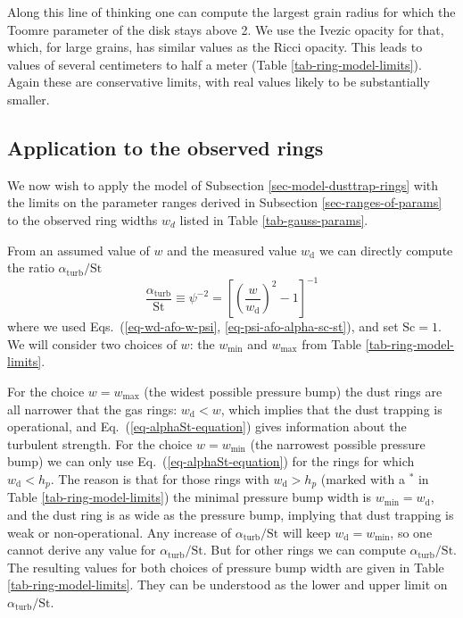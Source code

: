 \documentclass{aa}
\begin{document}
Along this line of thinking one can compute the largest grain radius for which
the Toomre parameter of the disk stays above 2. We use the Ivezic
opacity for that, which, for large grains, has similar values as the Ricci
opacity. This leads to values of several centimeters to half a meter (Table
\ref{tab-ring-model-limits}). Again these are conservative limits, with real
values likely to be substantially smaller. 


\subsection{Application to the observed rings}
\label{sec-application-to-rings}
%
We now wish to apply the model of Subsection \ref{sec-model-dusttrap-rings}
with the limits on the parameter ranges derived in Subsection
\ref{sec-ranges-of-params} to the observed ring widths $w_d$ listed in
Table \ref{tab-gauss-params}. 

From an assumed value of $w$ and the measured value $w_{\mathrm{d}}$ we can
directly compute the ratio $\alpha_{\mathrm{turb}}/\mathrm{St}$
\begin{equation}\label{eq-alphaSt-equation}
\frac{\alpha_{\mathrm{turb}}}{\mathrm{St}} \equiv \psi^{-2} = \left[\left(\frac{w}{w_{\mathrm{d}}}\right)^2-1\right]^{-1}
\end{equation}
where we used Eqs.~(\ref{eq-wd-afo-w-psi}, \ref{eq-psi-afo-alpha-sc-st}), and
set $\mathrm{Sc}=1$. We will consider two choices of $w$: the $w_{\mathrm{min}}$ and
$w_{\mathrm{max}}$ from Table \ref{tab-ring-model-limits}. 

For the choice $w=w_{\mathrm{max}}$ (the widest possible pressure bump) the dust
rings are all narrower that the gas rings: $w_{\mathrm{d}}<w$, which implies
that the dust trapping is operational, and Eq.~(\ref{eq-alphaSt-equation}) gives
information about the turbulent strength. For the choice $w=w_{\mathrm{min}}$
(the narrowest possible pressure bump) we can only use
Eq.~(\ref{eq-alphaSt-equation}) for the rings for which
$w_{\mathrm{d}}<h_p$. The reason is that for those rings with
$w_{\mathrm{d}}>h_p$ (marked with a $^{*}$ in Table \ref{tab-ring-model-limits})
the minimal pressure bump width is $w_{\mathrm{min}}=w_{\mathrm{d}}$, and the
dust ring is as wide as the pressure bump, implying that dust trapping is weak
or non-operational. Any increase of $\alpha_{\mathrm{turb}}/\mathrm{St}$ will
keep $w_{\mathrm{d}}=w_{\mathrm{min}}$, so one cannot derive any value for
$\alpha_{\mathrm{turb}}/\mathrm{St}$. But for other rings we can compute
$\alpha_{\mathrm{turb}}/\mathrm{St}$. The resulting values for both choices of
pressure bump width are given in Table \ref{tab-ring-model-limits}. They can be
understood as the lower and upper limit on $\alpha_{\mathrm{turb}}/\mathrm{St}$.
\end{document}
